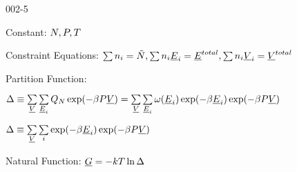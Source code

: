 \begin{mitframe}{002-5}

    
\begin{listone}
    
    \item Constant: $\nummoles, \p, \Temp$

    \item Constraint Equations: $\sum\nolimits \molspecies{i} = \totmoles, \sum\nolimits \molspecies{i}\uline{\energy}_{i} = \uline{\energy}^{total},\sum\nolimits \molspecies{i}\uline{\vol}_{i} = \uline{\vol}^{total}  $     %
    
    \item Partition Function:
    
    \begin{listtwo}
    
    	\item $\iipf \equiv \sum\limits_{\uline{\vol}}\sum\limits_{\uline{\energy}_{i}} \cpf\exp(-\boltznorm\p\uline{\vol}) = \sum\limits_{\uline{\vol}}\sum\limits_{\uline{\energy}_{i}} \mpf(\uline{\energy}_{i})\exp(-\boltznorm\uline{\energy}_{i})\exp(-\boltznorm\p\uline{\vol}) $
    
    	\item $\iipf \equiv \sum\limits_{\uline{\vol}}\sum\limits_{i} \exp(-\boltznorm\uline{\energy}_{i})\exp(-\boltznorm\p\uline{\vol}) $
    
    \end{listtwo}
        
    \item Natural Function: $\uline{\gibbs} = -\thermcond\Temp\ln\iipf$
    
\end{listone}
    
\end{mitframe}